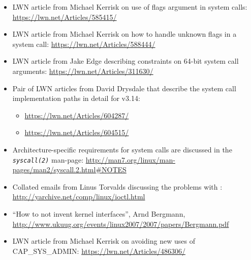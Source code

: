 \documentclass[a4paper,8pt,english]{sphinxmanual}
\begin{document}
\label{process/adding-syscalls:references-and-sources}\begin{itemize}
\item {} 
LWN article from Michael Kerrisk on use of flags argument in system calls:
\href{https://lwn.net/Articles/585415/}{https://lwn.net/Articles/585415/}

\item {} 
LWN article from Michael Kerrisk on how to handle unknown flags in a system
call: \href{https://lwn.net/Articles/588444/}{https://lwn.net/Articles/588444/}

\item {} 
LWN article from Jake Edge describing constraints on 64-bit system call
arguments: \href{https://lwn.net/Articles/311630/}{https://lwn.net/Articles/311630/}

\item {} 
Pair of LWN articles from David Drysdale that describe the system call
implementation paths in detail for v3.14:
\begin{itemize}
\item {} 
\href{https://lwn.net/Articles/604287/}{https://lwn.net/Articles/604287/}

\item {} 
\href{https://lwn.net/Articles/604515/}{https://lwn.net/Articles/604515/}

\end{itemize}

\item {} 
Architecture-specific requirements for system calls are discussed in the
\emph{\texttt{syscall(2)}} man-page:
\href{http://man7.org/linux/man-pages/man2/syscall.2.html\#NOTES}{http://man7.org/linux/man-pages/man2/syscall.2.html\#NOTES}

\item {} 
Collated emails from Linus Torvalds discussing the problems with :
\href{http://yarchive.net/comp/linux/ioctl.html}{http://yarchive.net/comp/linux/ioctl.html}

\item {} 
``How to not invent kernel interfaces'', Arnd Bergmann,
\href{http://www.ukuug.org/events/linux2007/2007/papers/Bergmann.pdf}{http://www.ukuug.org/events/linux2007/2007/papers/Bergmann.pdf}

\item {} 
LWN article from Michael Kerrisk on avoiding new uses of CAP\_SYS\_ADMIN:
\href{https://lwn.net/Articles/486306/}{https://lwn.net/Articles/486306/}


\end{itemize}
\end{document}
